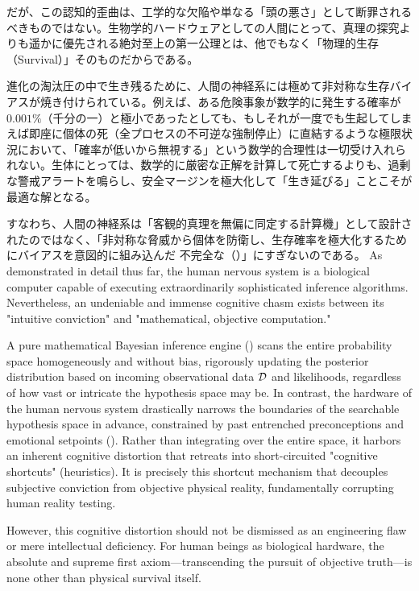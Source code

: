     だが、この認知的歪曲は、工学的な欠陥や単なる「頭の悪さ」として断罪されるべきものではない。生物学的ハードウェアとしての人間にとって、真理の探究よりも遥かに優先される絶対至上の第一公理とは、他でもなく「物理的生存（Survival）」そのものだからである。

    進化の淘汰圧の中で生き残るために、人間の神経系には極めて非対称な生存バイアスが焼き付けられている。例えば、ある危険事象が数学的に発生する確率が $0.001\%$（千分の一）と極小であったとしても、もしそれが一度でも生起してしまえば即座に個体の死（全プロセスの不可逆な強制停止）に直結するような極限状況において、「確率が低いから無視する」という数学的合理性は一切受け入れられない。生体にとっては、数学的に厳密な正解を計算して死亡するよりも、過剰な警戒アラートを鳴らし、安全マージンを極大化して「生き延びる」ことこそが最適な解となる。

    すなわち、人間の神経系は「客観的真理を無偏に同定する計算機」として設計されたのではなく、「非対称な脅威から個体を防衛し、生存確率を極大化するためにバイアスを意図的に組み込んだ
    不完全な\jaNQBIE （\fullNQBIE）」にすぎないのである。
\else
    As demonstrated in detail thus far, the human nervous system is a biological computer capable of executing extraordinarily sophisticated inference algorithms. Nevertheless, an undeniable and immense cognitive chasm exists between its "intuitive conviction" and "mathematical, objective computation."

    A pure mathematical Bayesian inference engine (\fullMBIE) scans the entire probability space homogeneously and without bias, rigorously updating the posterior distribution based on incoming observational data $\mathcal{D}$ and likelihoods, regardless of how vast or intricate the hypothesis space may be. In contrast, the hardware of the human nervous system drastically narrows the boundaries of the searchable hypothesis space in advance, constrained by past entrenched preconceptions and emotional setpoints (\mthVirtualConviction). Rather than integrating over the entire space, it harbors an inherent cognitive distortion that retreats into short-circuited "cognitive shortcuts" (heuristics). It is precisely this shortcut mechanism that decouples subjective conviction from objective physical reality, fundamentally corrupting human reality testing.

    However, this cognitive distortion should not be dismissed as an engineering flaw or mere intellectual deficiency. For human beings as biological hardware, the absolute and supreme first axiom—transcending the pursuit of objective truth—is none other than physical survival itself.

